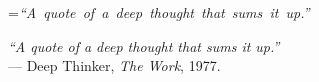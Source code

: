 

\cleardoublepage
\thispagestyle{empty}

\vspace*{55pt}

\begin{centering}

{=\hbox{\emph{``A quote of a deep thought that sums it up.''}}
 \begin{minipage}{\wd0}
 \emph{``A quote of a deep thought that sums it up.''}\\
 \null \hfill  --- Deep Thinker, \emph{The Work}, 1977.
 \end{minipage}
 \par}

\end{centering}

\vfill
\cleardoublepage
